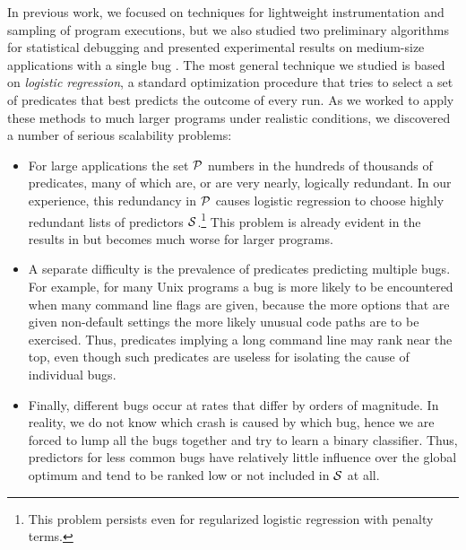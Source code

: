 \documentclass[draft]{sig-alternate}
\newcommand{\issue}[2][]{}
\begin{document}
In previous work, we focused on techniques
for lightweight instrumentation and sampling of program executions, but
we also studied two preliminary algorithms for statistical debugging and
presented experimental results on medium-size applications with a
single bug \cite{PLDI`03*141,NIPS2003_AP05}.  The most general
technique we studied is based on {\em logistic regression}, a standard
optimization procedure that tries to select a set of predicates that
best predicts the outcome of every run. As we worked to apply these
methods to much larger programs under realistic conditions, we
discovered a number of serious scalability problems:

\begin{itemize}

\item For large applications the set ${\cal P}$ numbers in the hundreds of
thousands of predicates, many of which are, or are very nearly,
logically redundant.  In our experience, this redundancy in ${\cal P}$
causes logistic regression to choose highly redundant lists of
predictors ${\cal S}$.\footnote{This problem persists even for
regularized logistic regression with penalty terms.}  This problem is
already evident in the results in \cite{PLDI`03*141} but becomes much
worse for larger programs.
\issue[Alice]{Logistic regression is not a global optimization
  technique.  The fact that predictors for less common bugs are ranked
  lower by logistic regression is a consequence of doing binary
  classification when we really should be doing multi-class
  classification.  But we can't do multi-class classification since we
  don't know the underlying bug labels. [text modified]}

\item A separate difficulty is the prevalence of predicates predicting
multiple bugs.  For example, for many Unix programs a bug is more
likely to be encountered when many command line flags are given,
because the more options that are given non-default settings the more
likely unusual code paths are to be exercised.  Thus, predicates
implying a long command line may rank near the top, even though such
predicates are useless for isolating the cause of individual bugs.

\issue{modified by Alice}
\item Finally, different bugs occur at rates that differ by orders of
magnitude.  In reality, we do not know which crash is caused by which bug, 
hence we are forced to lump all the bugs together and try to learn a binary
classifier.  Thus, predictors for less common bugs have relatively little
influence over the global optimum and tend to be ranked low or not included 
in ${\cal S}$ at all.

\end{itemize}
\end{document}
